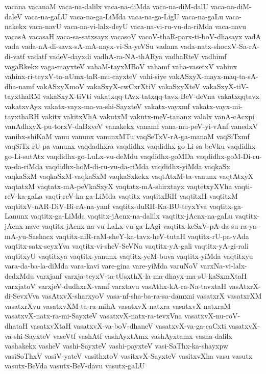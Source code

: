 {vacana
vacanaM
vaca-na-dalilx
vaca-na-diMda
vaca-na-diM-dalU
vaca-na-diM-daleV
vaca-na-gaLU
vaca-na-ga-LiMda
vaca-na-ga-LigU
vaca-na-gaLu
vaca-nakekx
vaca-navU
vaca-na-vi-lalx-deyU
vaca-na-vi-ru-vu-da-riMda
vaca-navu
vacasA
vacasaH
vaca-sa-satxsayx
vacasoV
vacoV-thaR-parx-ti-boV-dhasayx
vadA
vada
vada-nA-di-savx-sA-mA-nayx-vi-Sa-yeVSu
vadana
vada-natx-shocxV-Sa-rA-di-vatf
vadatf
vadeV-dayxdi
vadhA-ra-NA-thARya
vadhaRteV
vadhimf
vagaRkekx
vaga-mayxteV
vahaM-tayxMBoV
vahamf
vaha-vasetxV
vahinx
vahinx-ri-teyxV-ta-nUmx-taR-mu-cayxteV
vahi-siye
vakASxyX-mayx-maq-ta-sA-dha-namf
vakASxyXmoV
vakaSxyX-cwCxrXtiV
vakaSxyXteV
vakaSxyX-tiV-tayxthaRM
vakaSxyX-tiVti
vakatxqq-tAvx-tatxqq-tavx-BeV-deVna
vakatxqqtavx
vakatxvAyx
vakatx-vayx-ma-va-shi-SayxteV
vakatx-vayxmf
vakatx-vayx-mi-tayxthaRH
vakitx
vakitxVhA
vakutxM
vakutx-meV-tananx
valalx
vanA-cAcxpi
vanAdhxyX-pu-torxV-daBxveV
vanakekx
vanamf
vana-mu-peV-yi-vAnf
vanedxV
vanihx-shiKaM
vanu
vanunx
vanunxMTu
vaqSeTxV-rA-ga-manaM
vaqSiTxmf
vaqSiTx-rU-pa-vanunx
vaqdadhxra
vaqdidhx
vaqdidhx-go-Li-sa-beVku
vaqdidhx-go-Li-sutAtx
vaqdidhx-go-LuLx-vu-deMdu
vaqdidhx-goMDa
vaqdidhx-goM-Di-ru-va-da-riMda
vaqdidhx-hoM-di-ru-vu-da-riMda
vaqdidhx-yiMda
vaqkaSx
vaqkaSxM
vaqkaSxM-vaqkaSxM
vaqkaSxkekx
vaqtAtxM-ta-vanunx
vaqtAtxyX
vaqtatxM
vaqtatx-mA-peVkaSxyX
vaqtatx-mA-shirxtayx
vaqtetxyXVha
vaqti-reV-ka-gaLa
vaqti-reV-ka-ga-LiMda
vaqtitx
vaqtitxBiH
vaqtitxH
vaqtitxM
vaqtitxV-nAR-DiV-Bi-rA-na-yanf
vaqtitx-duRH-Ka-BU-teyxYva
vaqtitx-ga-Lanunx
vaqtitx-ga-LiMda
vaqtitx-jAcnx-na-dalilx
vaqtitx-jAcnx-na-gaLu
vaqtitx-jAcnx-nave
vaqtitx-jAcnx-na-vu-LaLx-vu-ga-LAgi
vaqtitx-keSxV-pA-da-su-ra-ya-mA-yu-Sashacx
vaqtitx-niR-raM-sheY-ka-tavx-heV-tutaH
vaqtitx-rU-pa-vAda
vaqtitx-satx-seyxYva
vaqtitx-vi-sheV-SeVNa
vaqtitx-yA-gali
vaqtitx-yA-gi-rali
vaqtitxyU
vaqtitxya
vaqtitx-yanunx
vaqtitx-yeM-buva
vaqtitx-yiMda
vaqtitxyu
vara-da-ba-la-diMda
vara-kavi
vare-gina
vare-yiMda
varuNoV
varxNa-vi-lalx-dedxMdu
varxjanf
varxja-teyxV-ta-tUsxthX-la-ma-dhayx-ma-sU-kaSxmXtaH
varxjatoV
varxjeV-dudhxrX-vamf
varxtavu
vasAthx-kA-ra-Na-tavxtaH
vasAtxrX-di-SevxVva
vasAtxvX-sharxyoV
vasa-nf-sha-ba-ra-sa-damxni
vasatxrX
vasatxrXM
vasatxrXvu
vasatxvXM-ta-ra-mihA
vasatxvX-natxra
vasatxvX-natxraM
vasatxvX-natx-ra-mi-SayxteV
vasatxvX-natx-ra-tevxVna
vasatxvX-nu-roV-dhataH
vasatxvXtaH
vasatxvX-va-boV-dhaneV
vasatxvX-va-ga-caCxti
vasatxvX-va-shi-SayxteV
vaseVtf
vashAtf
vashAyxtAmx
vashAyxtamx
vasha-dalilx
vashakekx
vasheV
vashi-SayxteV
vashi-payxteV
vasi-SaThx-ka-shayxpw
vasiSoThxV
vasiV-yateV
vasithxtoV
vasitxvX-SayxteV
vasitxvXha
vasu
vasutx
vasutx-BeVda
vasutx-BeV-davu
vasutx-gaLU
}
